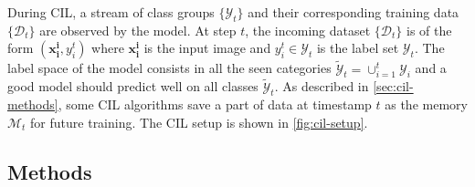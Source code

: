During CIL, a stream of class groups $\{\mathcal{Y}_t\}$ and their corresponding training data $\{\mathcal{D}_t\}$ are observed by the model. At step $t$, the incoming dataset $\{\mathcal{D}_t\}$ is of the form $(\textbf{x}_{\textbf{i}}^{\textbf{i}}, y_i^t)$ where $\textbf{x}_{\textbf{i}}^{\textbf{i}}$ is the input image and $y_i^t \in \mathcal{Y}_t$ is the label set $\mathcal{Y}_t$. The label space of the model consists in all the seen categories $\tilde{\mathcal{Y}}_t = \cup_{i=1}^t \mathcal{Y}_i$ and a good model should predict well on all classes $\tilde{\mathcal{Y}}_t$. As described in \autoref{sec:cil-methods}, some CIL algorithms save a part of data at timestamp $t$ as the memory $\mathcal{M}_t$ for future training. The CIL setup is shown in \autoref{fig:cil-setup}.

\subsection{Methods}
\label{sec:pycil}
\label{sec:cil-methods}


